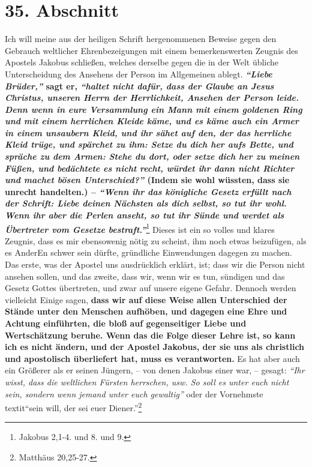 \section{35. Abschnitt} \label{kap9_ab35}

Ich will meine aus der heiligen Schrift hergenommenen Beweise gegen den Gebrauch
weltlicher Ehrenbezeigungen mit einem bemerkenswerten Zeugnis des Apostels
Jakobus schließen, welches derselbe gegen die in der Welt übliche Unterscheidung
des Ansehens der Person im Allgemeinen ablegt. 
\textbf{\textit{"`Liebe Brüder,"'} sagt er,
\textit{"`haltet nicht dafür, dass der Glaube an Jesus Christus, unseren Herrn
der
Herrlichkeit, Ansehen der Person leide. Denn wenn in eure Versammlung ein Mann
mit einem goldenen Ring und mit einem herrlichen Kleide käme, und es käme auch
ein Armer in einem unsaubern Kleid, und ihr sähet auf den, der das herrliche
Kleid trüge, und spärchet zu ihm: Setze du dich her aufs Bette, und spräche zu
dem Armen: Stehe du dort, oder setze dich her zu meinen Füßen, und bedächtete es
nicht recht, würdet ihr dann nicht Richter und machet bösen Unterschied?"'}
(Indem sie wohl wüssten, dass sie unrecht handelten.) --\textit{ "`Wenn ihr das
königliche
Gesetz erfüllt nach der Schrift: Liebe deinen Nächsten als dich selbst, so tut
ihr wohl. Wenn ihr aber die Perlen anseht, so tut ihr Sünde und werdet
als Übertreter vom Gesetze bestraft."'}}\footnote{Jakobus 2,1-4. und 8. und 9.}
Dieses ist
ein so volles und klares Zeugnis, dass es mir ebensowenig nötig zu scheint, ihm
noch etwas beizufügen, als es AnderEn schwer sein dürfte, gründliche
Einwendungen
dagegen zu machen. Das erste, was der Apostel uns ausdrücklich erklärt, ist;
dass
wir die Person nicht ansehen sollen, und das zweite, dass wir, wenn wir es tun,
sündigen und das Gesetz Gottes übertreten, und zwar auf unsere eigene Gefahr.
Dennoch werden vielleicht Einige sagen, \label{ref:09_35_staende_abschaffen}
\textbf{dass wir auf diese Weise allen
Unterschied der Stände unter den Menschen aufhöben, und dagegen eine Ehre und
Achtung einführten, die bloß auf gegenseitiger Liebe und Wertschätzung beruhe.
Wenn das die Folge dieser Lehre ist, so kann ich es nicht ändern, und der
Apostel Jakobus, der sie uns als christlich und apostolisch überliefert hat,
muss es verantworten.} Es hat aber auch ein Größerer als er seinen Jüngern, --
von denen Jakobus einer war, -- gesagt:
\textit{"`Ihr wisst, dass die weltlichen Fürsten
herrschen, usw. So soll es unter euch nicht sein, sondern wenn jemand unter
euch gewaltig"'} oder der Vornehmste\\textit{"`sein will, der sei euer
Diener."'}\footnote{Matthäus 20,25-27.}

